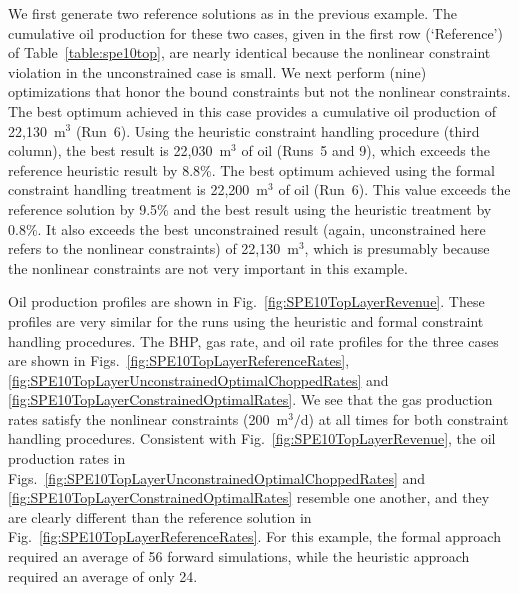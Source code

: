 \documentclass[twocolumn,numbook]{svjour3}          %
\begin{document}
We first generate two reference solutions as in the previous example. The cumulative oil production for these two cases, given in the first row (`Reference') of Table~\ref{table:spe10top}, are nearly identical because the nonlinear constraint violation in the
unconstrained case is small. We next perform (nine) optimizations that honor the bound constraints but not the nonlinear constraints. The best optimum achieved in this case provides a cumulative oil production of 22,130~m$^3$ (Run~6). Using the heuristic constraint handling procedure (third column), the best result is 22,030~m$^3$ of oil (Runs~5 and 9), which
exceeds the reference heuristic result by 8.8\%. The best optimum achieved using the formal constraint handling treatment is 22,200~m$^3$ of oil (Run~6). This value exceeds the reference solution by 9.5\% and the best result using the heuristic treatment by 0.8\%. It also exceeds the best unconstrained result (again, unconstrained here refers to the nonlinear constraints) of 22,130~m$^3$, which is presumably because the nonlinear constraints are not very important in this example.

Oil production profiles are shown in Fig.~\ref{fig:SPE10TopLayerRevenue}. These profiles are very similar for the runs using the heuristic and formal constraint handling procedures. The BHP, gas rate, and oil rate profiles for the three cases are shown in
Figs.~\ref{fig:SPE10TopLayerReferenceRates},
\ref{fig:SPE10TopLayerUnconstrainedOptimalChoppedRates} and
\ref{fig:SPE10TopLayerConstrainedOptimalRates}. We see that the gas production rates satisfy the nonlinear constraints (200~m$^3/$d) at all times for both constraint handling procedures. Consistent with Fig.~\ref{fig:SPE10TopLayerRevenue}, the oil production rates in Figs.~\ref{fig:SPE10TopLayerUnconstrainedOptimalChoppedRates} and
\ref{fig:SPE10TopLayerConstrainedOptimalRates} resemble one another, and they are clearly different than the reference solution in Fig.~\ref{fig:SPE10TopLayerReferenceRates}. 
For this example, the formal approach required an average of 56 forward simulations, while the heuristic approach required an average of only 24.
\end{document}
